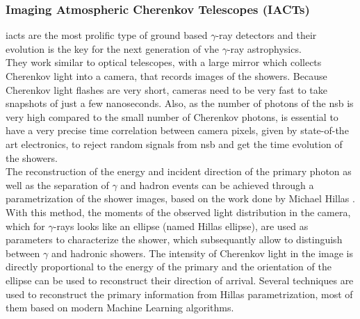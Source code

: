 \documentclass[main.tex]{subfiles}
\begin{document}
\subsubsection{Imaging Atmospheric Cherenkov Telescopes (IACTs)}

\glspl{iact} are the most prolific type of ground based $\gamma$-ray detectors and their evolution is the key for the next generation of \gls{vhe} $\gamma$-ray astrophysics.\\
They work similar to optical telescopes, with a large mirror which collects Cherenkov light into a camera, that records images of the showers. 
Because Cherenkov light flashes are very short, cameras need to be very fast to take snapshots of just  a few nanoseconds. Also, as the number of photons of the \gls{nsb} is very high compared to the small number of Cherenkov photons, is essential to have a very precise time correlation between camera pixels, given by state-of-the art electronics, to reject random signals from \gls{nsb} and get the time evolution of the showers.\\
The reconstruction of the energy and incident direction of the primary photon as well as the separation of $\gamma$ and hadron events can be achieved through a parametrization of the shower images, based on the work done by Michael Hillas \cite{1985Hillas}. With this method, the moments of the observed light distribution in the camera, which for $\gamma$-rays looks like an ellipse (named Hillas ellipse), are used as parameters to characterize the shower, which subsequantly allow to distinguish between $\gamma$  and hadronic showers. The intensity of Cherenkov light in the image is directly proportional to the energy of the primary and the orientation of the ellipse can be used to reconstruct their direction of arrival. Several techniques are used to reconstruct the primary information from Hillas parametrization, most of them based on modern Machine Learning algorithms.
\end{document}
